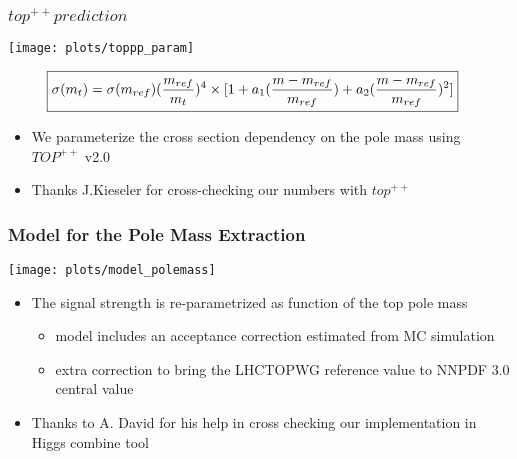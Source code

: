 \documentclass{beamer}
\begin{document}
\begin{frame}
\frametitle{$top^{++} prediction$}
\begin{center}
    \texttt{[image: plots/toppp\_param]}
    \end{center}
\vspace{-0.25cm}
    \scriptsize
    \begin{align}
\Aboxed{\sigma(m_{t})=\sigma(m_{ref})(\frac{m_{ref}}{m_{t}})^4 \times [1 + a_1 (\frac{m-m_{ref}}{m_{ref}}) + a_2 (\frac{m-m_{ref}}{m_{ref}})^2]}\nonumber
    \end{align}
    \begin{itemize}
    \scriptsize
    \item We parameterize the cross section dependency on the pole mass using $TOP^{++}$ v2.0
    \item Thanks J.Kieseler for cross-checking our numbers with $top^{++}$
    \end{itemize}
\end{frame}
\begin{frame}
\frametitle{Model for the Pole Mass Extraction}
\begin{center}
    \texttt{[image: plots/model\_polemass]}
    \end{center}
    \begin{itemize}
    \small
    \item The signal strength is re-parametrized as function of the top pole mass
    \begin{itemize}
    \small
    \item model includes an acceptance correction estimated from MC simulation
    \item extra correction to bring the LHCTOPWG reference value to NNPDF 3.0 central value
    \end{itemize}
    \item Thanks to A. David for his help in cross checking our implementation in Higgs combine tool
    \end{itemize}
\end{frame}
\end{document}
